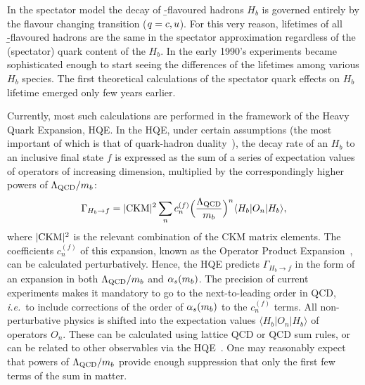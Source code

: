 %
%


In the spectator model the decay of \b-flavoured hadrons $H_b$ is
governed entirely by the flavour changing  transition
($q=c,u$).  For this very reason, lifetimes of all
\b-flavoured hadrons are the same in the spectator approximation
regardless of the (spectator) quark content of the $H_b$.  In the early
1990's experiments became sophisticated enough to start seeing the
differences of the lifetimes among various $H_b$ species.  The first
theoretical calculations of the spectator quark effects on $H_b$
lifetime emerged only few years earlier.

Currently, most such calculations are performed in the framework of
the Heavy Quark Expansion, HQE.  In the HQE, under certain assumptions
(the most important of which is that of
quark-hadron duality~\cite{Shifman:2000jv}), the decay
rate of an $H_b$ to an inclusive final state $f$ is expressed as the sum
of a series of expectation values of operators of increasing dimension,
multiplied by the correspondingly higher powers of $\Lambda_{\rm
QCD}/m_b$:
\begin{equation}
\Gamma_{H_b\to f} = |{\rm CKM}|^2\sum_n c_n^{(f)}
\Bigl(\frac{\Lambda_{\rm QCD}}{m_b}\Bigr)^n\langle H_b|O_n|H_b\rangle,
\labe{hqe}
\end{equation}
where $|{\rm CKM}|^2$ is the relevant combination of the CKM matrix elements.
The coefficients $c_n^{(f)}$ of this expansion, known as the Operator Product
Expansion~\cite{Shifman:1986mx,*Chay:1990da,*Bigi:1992su,*Bigi:1992su_erratum},
can be calculated perturbatively.  Hence, the HQE
predicts $\Gamma_{H_b\to f}$ in the form of an expansion in both
$\Lambda_{\rm QCD}/m_{b}$ and $\alpha_s(m_{b})$.  The precision of
current experiments makes it mandatory to go to the next-to-leading
order in QCD, {\em i.e.}\ to include corrections of the order of
$\alpha_s(m_{b})$ to the $c_n^{(f)}$ terms.  All non-perturbative physics
is shifted into the expectation values $\langle H_b|O_n|H_b\rangle$ of
operators $O_n$.  These can be calculated using lattice QCD or QCD sum
rules, or can be related to other observables via the
HQE~\cite{Bigi:1995jr,*Bellini:1996ra}.  One may reasonably expect that powers of
$\Lambda_{\rm QCD}/m_{b}$ provide enough suppression that only the
first few terms of the sum in  matter.

